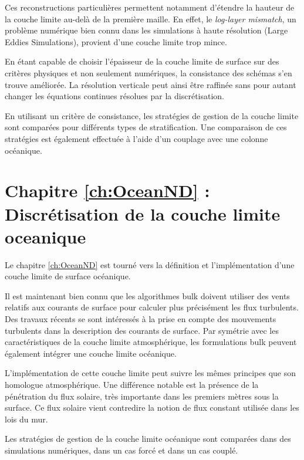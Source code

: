 Ces reconstructions particulières permettent notamment
	d'étendre la hauteur de la couche limite au-delà
	de la première maille.
	En effet, le \textit{log-layer mismatch},
	un problème numérique bien connu dans les
	simulations à haute résolution (Large Eddies
	Simulations),
	provient d'une couche limite trop mince.
\par
En étant capable de choisir l'épaisseur de la couche
	limite de surface sur des critères physiques et non
	seulement numériques, la consistance des schémas
	s'en trouve améliorée. La résolution verticale
	peut ainsi être raffinée sans pour autant changer
	les équations continues résolues par la
			discrétisation.
\par
En utilisant un critère de consistance, les stratégies
	de gestion de la couche limite sont
	comparées pour différents types de stratification.
	Une comparaison de ces stratégies est également effectuée
	à l'aide d'un couplage avec une colonne océanique.
\section*{Chapitre \ref{ch:OceanND} : Discrétisation de
la couche limite oceanique}
Le chapitre \ref{ch:OceanND} est tourné vers la définition et l'implémentation
d'une couche limite de surface océanique.
\par
Il est maintenant bien connu que les algorithmes
	bulk doivent utiliser des vents relatifs aux
	courants de surface pour calculer plus précisément
	les flux turbulents.
	Des travaux récents \citep{pelletier_two-sided_2021}
	se sont intéressés à la prise en compte des mouvements
	turbulents dans la description des courants de
	surface. Par symétrie avec les caractéristiques
	de la couche limite atmosphérique, les formulations
	bulk peuvent également intégrer une couche
	limite océanique.
\par
L'implémentation de cette couche limite peut suivre
	les mêmes principes que son homologue atmosphérique.
	Une différence notable est la présence de la
	pénétration du flux solaire, très importante dans
	les premiers mètres sous la surface.
	Ce flux solaire vient contredire la notion de flux
	constant utilisée dans les lois du mur.
\par
Les stratégies de gestion de la couche limite
	océanique sont comparées dans des simulations numériques,
	dans un cas forcé et dans un cas couplé.
